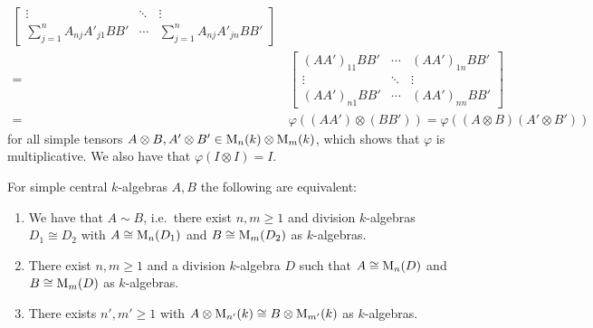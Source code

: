 \begin{remark}
\begin{align*}
\begin{bmatrix}
            \vdots                            & \ddots  & \vdots                            \\
            \sum_{j=1}^n A_{nj} A'_{j1} B B'  & \cdots  & \sum_{j=1}^n A_{nj} A'_{jn} B B'
          \end{bmatrix}
          \\
    =&\,  \begin{bmatrix}
            (A A')_{11} B B' & \cdots  & (A A')_{1n} B B' \\
            \vdots           & \ddots  & \vdots           \\
            (A A')_{n1} B B' & \cdots  & (A A')_{nn} B B'
          \end{bmatrix}
    \\
    =&\,  \varphi((A A') \otimes (B B'))
    =     \varphi((A \otimes B) (A' \otimes B'))
  \end{align*}
  for all simple tensors $A \otimes B, A' \otimes B' \in \operatorname{M}_n(k) \otimes \operatorname{M}_m(k)$, which shows that $\varphi$ is multiplicative.
  We also have that $\varphi(I \otimes I) = I$.
\end{remark}


\begin{lemma}
  \label{lemma: characterization of Brauer equivalence}
  For simple central $k$-algebras $A, B$ the following are equivalent:
  \begin{enumerate}
    \item
      \label{enumerate: matrices over isomorphic division algebra}
      We have that $A \sim B$, i.e.\ there exist $n, m \geq 1$ and division $k$-algebras $D_1 \cong D_2$ with $A \cong \operatorname{M}_n(D_1)$ and $B \cong \operatorname{M}_m(D_2)$ as $k$-algebras.
    \item
      \label{enumerate: matrices over same division algebra}
      There exist $n, m \geq 1$ and a division $k$-algebra $D$ such that $A \cong \operatorname{M}_n(D)$ and $B \cong \operatorname{M}_m(D)$ as $k$-algebras.
    \item
      \label{enumerate: up to tensor with a matrix ring}
      There exists $n', m' \geq 1$ with $A \otimes \operatorname{M}_{n'}(k) \cong B \otimes \operatorname{M}_{m'}(k)$ as $k$-algebras.
  \end{enumerate}
\end{lemma}



